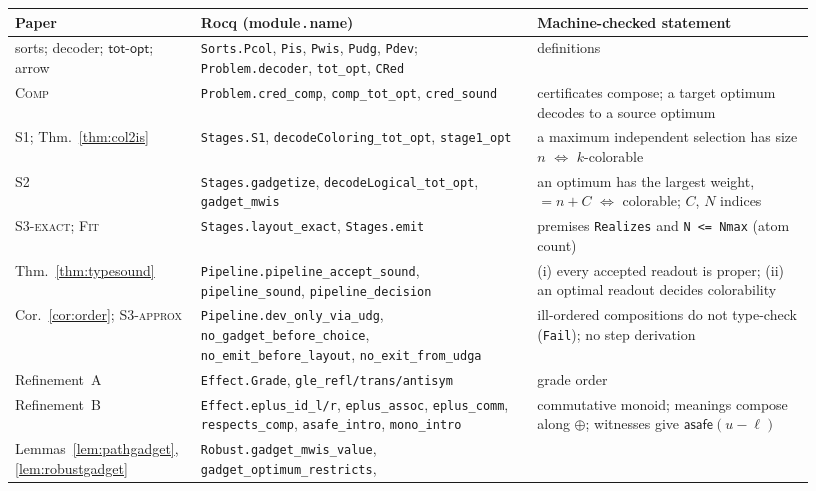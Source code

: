 \documentclass[a4paper,fleqn]{cas-sc}
\newcommand{\asafe}[1]{\textsf{asafe}(#1)}
\newcommand{\totopt}{\mathsf{tot\text{-}opt}}
\newcommand{\rn}[1]{\textup{\textsc{\footnotesize #1}}}
\begin{document}
\begin{table}[tb]
\centering
\small
\begin{tabular}{@{}>{\raggedright\arraybackslash}p{0.20\linewidth}>{\raggedright\arraybackslash}p{0.40\linewidth}>{\raggedright\arraybackslash}p{0.33\linewidth}@{}}
\toprule
Paper & Rocq (module\,.\,name) & Machine-checked statement \\
\midrule
sorts; decoder; $\totopt$; arrow
  & \texttt{Sorts.Pcol}, \texttt{Pis}, \texttt{Pwis}, \texttt{Pudg}, \texttt{Pdev};
    \texttt{Problem.decoder}, \texttt{tot\_opt}, \texttt{CRed}
  & definitions \\
\rn{Comp}
  & \texttt{Problem.cred\_comp}, \texttt{comp\_tot\_opt}, \texttt{cred\_sound}
  & certificates compose; a target optimum decodes to a source optimum \\
\rn{S1}; Thm.~\ref{thm:col2is}
  & \texttt{Stages.S1}, \texttt{decodeColoring\_tot\_opt}, \texttt{stage1\_opt}
  & a maximum independent selection has size $n$ $\iff$ $k$-colorable \\
\rn{S2}
  & \texttt{Stages.gadgetize}, \texttt{decodeLogical\_tot\_opt}, \texttt{gadget\_mwis}
  & an optimum has the largest weight, $=n+C$ $\iff$ colorable; $C$, $N$ indices \\
\rn{S3-exact}; \rn{Fit}
  & \texttt{Stages.layout\_exact}, \texttt{Stages.emit}
  & premises \texttt{Realizes} and \texttt{N <= Nmax} (atom count) \\
Thm.~\ref{thm:typesound}
  & \texttt{Pipeline.pipeline\_accept\_sound}, \texttt{pipeline\_sound},
    \texttt{pipeline\_decision}
  & (i) every accepted readout is proper; (ii) an optimal readout decides
    colorability \\
Cor.~\ref{cor:order}; \rn{S3-approx}
  & \texttt{Pipeline.dev\_only\_via\_udg}, \texttt{no\_gadget\_before\_choice},
    \texttt{no\_emit\_before\_layout}, \texttt{no\_exit\_from\_udga}
  & ill-ordered compositions do not type-check (\texttt{Fail}); no step
    derivation \\
Refinement~A
  & \texttt{Effect.Grade}, \texttt{gle\_refl/trans/antisym}
  & grade order \\
Refinement~B
  & \texttt{Effect.eplus\_id\_l/r}, \texttt{eplus\_assoc}, \texttt{eplus\_comm},
    \texttt{respects\_comp}, \texttt{asafe\_intro}, \texttt{mono\_intro}
  & commutative monoid; meanings compose along $\oplus$; witnesses give
    $\asafe{u-\ell}$ \\
Lemmas~\ref{lem:pathgadget}, \ref{lem:robustgadget}
  & \texttt{Robust.gadget\_mwis\_value}, \texttt{gadget\_optimum\_restricts},

\end{tabular}
\end{table}
\end{document}
